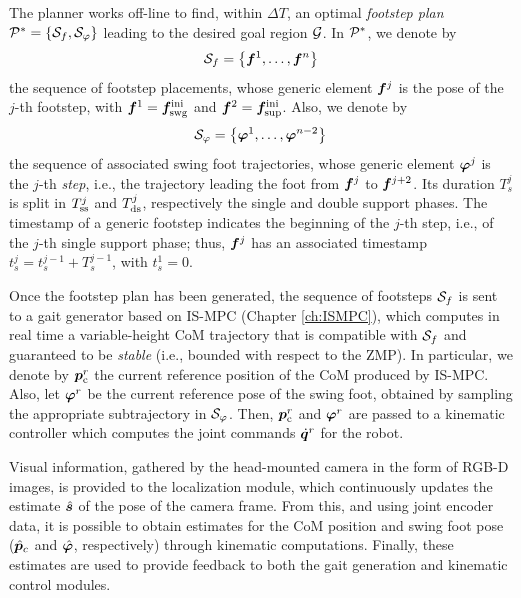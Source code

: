 The planner works off-line to find, within $\Delta T$, an optimal
\textit{footstep plan} ${\cal P}^\ast = \{ {\cal S}_f, {\cal S}_\varphi \}$
leading to the desired goal region $\cal G$. In ${\cal P}^*$, we denote by
\begin{equation*}
    {\cal S}_f = \left\{{\bm{f}}^1, \dots, {\bm{f}}^n\right\}
\end{equation*}
the sequence of footstep placements, whose generic element ${\bm{f}}^j$ is the
pose of the $j$-th footstep, with ${\bm{f}}^1 = {\bm{f}}_{\rm swg}^{\rm ini}$ and
${\bm{f}}^2 = {\bm{f}}_{\rm sup}^{\rm ini}$. Also, we denote by
\begin{equation*}
    {\cal S}_\varphi = \left\{{\bm{\varphi}}^1, \dots, {\bm{\varphi}}^{n-2}\right\}
\end{equation*} 
the sequence of associated swing foot trajectories, whose generic element
${\bm{\varphi}}^j$ is the $j$-th {\em step}, i.e., the trajectory leading the foot
from ${\bm{f}}^{j}$ to ${\bm{f}}^{j+2}$. Its duration $T_s^j$ is split in $T_{\rm ss}^j$
and $T_{\rm ds}^j$, respectively the single and double support phases. 
The timestamp of a generic footstep indicates the beginning of the $j$-th step,
i.e., of the $j$-th single support phase; thus, ${\bm{f}}^{j}$ has an associated
timestamp $t_s^{j} = t_s^{j-1} + T_s^{j-1}$, with $t_s^{1}=0$.

Once the footstep plan has been generated, the sequence of footsteps
${\cal S}_{f}$ is sent to a gait generator based on IS-MPC
(Chapter \ref{ch:ISMPC}), which computes in real time a variable-height
CoM trajectory that
is compatible with ${\cal S}_{f}$ and guaranteed to be {\em stable} (i.e.,
bounded with respect to the ZMP). In particular, we denote by ${\bm{p}}_{\rm c}^r$
the current reference position of the CoM produced by IS-MPC. Also, let
${\bm{\varphi}}^r$ be the current reference pose of the swing foot, obtained by
sampling the appropriate subtrajectory in ${\cal S}_{\varphi}$. Then,
${\bm{p}}_{\rm c}^r$ and ${\bm{\varphi}}^r$ are passed to a kinematic controller which
computes the joint commands $\dot{{\bm{q}}}^r$ for the robot.

Visual information, gathered by the head-mounted camera in the form of RGB-D
images, is provided to the localization module, which continuously updates the
estimate $\hat{{\bm{s}}}$ of the pose of the camera frame.
From this, and using joint encoder data, it is possible to obtain estimates for
the CoM position and swing foot pose ($\hat {{\bm{p}}}_c$ and $\hat {{\bm{\varphi}}}$,
respectively) through kinematic computations. Finally, these estimates are used
to provide feedback to both the gait generation and kinematic control modules.

